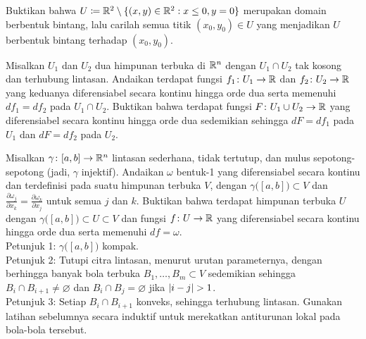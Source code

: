 \begin{exercise}
Buktikan bahwa
$U \coloneqq {\mathbb{R}}^2 \setminus \{ (x,y) \in {\mathbb{R}}^2 : x \leq 0, y=0 \}$ merupakan
domain berbentuk bintang, lalu carilah semua titik $(x_0,y_0) \in U$ yang
menjadikan $U$ berbentuk bintang terhadap $(x_0,y_0)$.
\end{exercise}

\begin{exercise}
Misalkan $U_1$ dan $U_2$ dua himpunan terbuka di ${\mathbb{R}}^n$ dengan
$U_1 \cap U_2$ tak kosong dan terhubung lintasan. Andaikan terdapat fungsi
$f_1 \colon U_1 \to {\mathbb{R}}$ dan $f_2 \colon U_2 \to {\mathbb{R}}$ yang keduanya
diferensiabel secara kontinu hingga orde dua serta memenuhi
$df_1 = df_2$ pada $U_1 \cap U_2$. Buktikan bahwa terdapat fungsi
$F \colon U_1 \cup U_2 \to {\mathbb{R}}$ yang diferensiabel secara kontinu hingga orde
dua sedemikian sehingga $dF = df_1$ pada $U_1$ dan $dF = df_2$ pada $U_2$.
\end{exercise}

\begin{exercise}[Sulit]
Misalkan $\gamma \colon [a,b] \to {\mathbb{R}}^n$ lintasan sederhana, tidak tertutup,
dan mulus sepotong-sepotong (jadi, $\gamma$ injektif). Andaikan $\omega$
bentuk-1 yang diferensiabel secara kontinu dan terdefinisi pada suatu himpunan
terbuka $V$, dengan $\gamma\bigl([a,b]\bigr) \subset V$ dan
$\frac{\partial \omega_j}{\partial x_k} = \frac{\partial \omega_k}{\partial
 x_j}$
untuk semua $j$ dan $k$. Buktikan bahwa terdapat himpunan terbuka $U$ dengan
$\gamma\bigl([a,b]\bigr) \subset U \subset V$ dan fungsi
$f \colon U \to {\mathbb{R}}$ yang diferensiabel secara kontinu hingga orde dua serta
memenuhi $df = \omega$.
\\
Petunjuk 1: $\gamma\bigl([a,b]\bigr)$ kompak.\\
Petunjuk 2: Tutupi citra lintasan, menurut urutan parameternya, dengan berhingga
banyak bola terbuka $B_1,\ldots,B_m\subset V$ sedemikian sehingga
$B_i\cap B_{i+1}\neq\varnothing$ dan $B_i\cap B_j=\varnothing$ jika
$\lvert {i-j} \rvert>1$.\\
Petunjuk 3: Setiap $B_i\cap B_{i+1}$ konveks, sehingga terhubung lintasan.
Gunakan latihan sebelumnya secara induktif untuk merekatkan antiturunan lokal
pada bola-bola tersebut.
\end{exercise}

